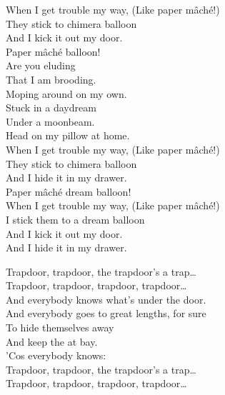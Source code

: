 When I get trouble my way, (Like paper mâché!) \\
They stick to chimera balloon \\
And I kick it out my door. \\

Paper mâché  balloon! \\

Are you eluding \\
That I am brooding. \\
Moping around on my own. \\
Stuck in a daydream \\
Under a moonbeam. \\
Head on my pillow at home. \\

When I get trouble my way, (Like paper mâché!) \\
They stick to chimera balloon \\
And I hide it in my drawer. \\

Paper mâché dream balloon! \\

When I get trouble my way, (Like paper mâché!) \\
I stick them to a dream balloon \\
And I kick it out my door. \\
And I hide it in my drawer. \\




Trapdoor, trapdoor, the trapdoor's a trap… \\
Trapdoor, trapdoor, trapdoor, trapdoor… \\

And everybody knows what's under the door. \\
And everybody goes to great lengths, for sure \\
To hide themselves away \\
And keep the  at bay. \\
'Cos everybody knows: \\

Trapdoor, trapdoor, the trapdoor's a trap… \\
Trapdoor, trapdoor, trapdoor, trapdoor… \\

